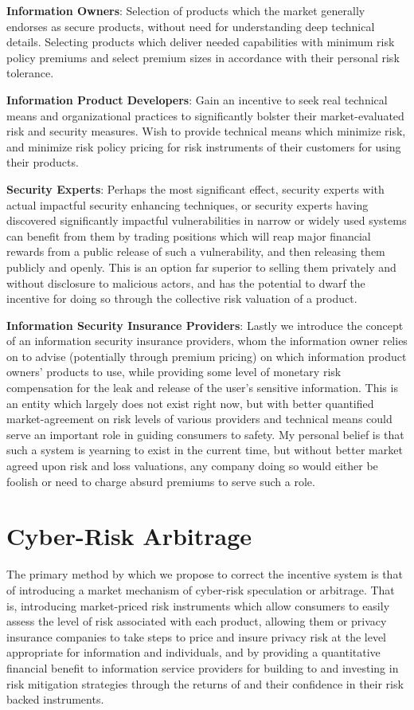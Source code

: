 \documentclass[conference]{IEEEtran}
\begin{document}
\textbf{Information Owners}: Selection of products which the market generally endorses as secure products, without need for understanding deep technical details.  Selecting products which deliver needed capabilities with minimum risk policy premiums and select premium sizes in accordance with their personal risk tolerance.

\textbf{Information Product Developers}: Gain an incentive to seek real technical means and organizational practices to significantly bolster their market-evaluated risk and security measures. Wish to provide technical means which minimize risk, and minimize risk policy pricing for risk instruments of their customers for using their products.

\textbf{Security Experts}: Perhaps the most significant effect, security experts with actual impactful security enhancing techniques, or security experts having discovered significantly impactful vulnerabilities in narrow or widely used systems can benefit from them by trading positions which will reap major financial rewards from a public release of such a vulnerability, and then releasing them publicly and openly. This is an option far superior to selling them privately and without disclosure to malicious actors, and has the potential to dwarf the incentive for doing so through the collective risk valuation of a product.


\textbf{Information Security Insurance Providers}: Lastly we introduce the concept of an information security insurance providers, whom the information owner relies on to advise (potentially through premium pricing) on which information product owners’ products to use, while providing some level of monetary risk compensation for the leak and release of the user’s sensitive information.  This is an entity which largely does not exist right now, but with better quantified market-agreement on risk levels of various providers and technical means could serve an important role in guiding consumers to safety. My personal belief is that such a system is yearning to exist in the current time, but without better market agreed upon risk and loss valuations, any company doing so would either be foolish or need to charge absurd premiums to serve such a role.

\section{Cyber-Risk Arbitrage}
The primary method by which we propose to correct the incentive system is that of introducing a market mechanism of cyber-risk speculation or arbitrage.   That is, introducing market-priced risk instruments which allow consumers to easily assess the level of risk associated with each product, allowing them or privacy insurance companies to take steps to price and insure privacy risk at the level appropriate for information and individuals, and by providing a quantitative financial benefit to information service providers for building to and investing in risk mitigation strategies through the returns of and their confidence in their risk backed instruments.
\end{document}
